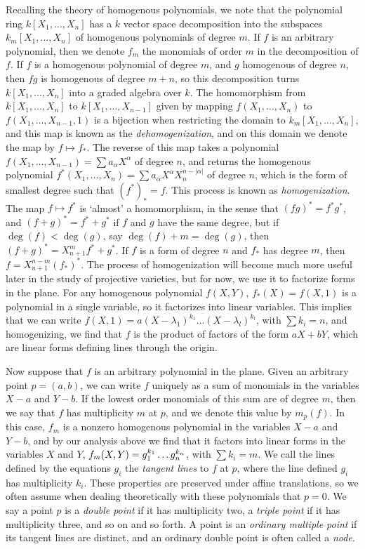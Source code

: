 Recalling the theory of homogenous polynomials, we note that the polynomial ring $k[X_1, \dots, X_n]$ has a $k$ vector space decomposition into the subspaces $k_m[X_1, \dots, X_n]$ of homogenous polynomials of degree $m$. If $f$ is an arbitrary polynomial, then we denote $f_m$ the monomials of order $m$ in the decomposition of $f$. If $f$ is a homogenous polynomial of degree $m$, and $g$ homogenous of degree $n$, then $fg$ is homogenous of degree $m + n$, so this decomposition turns $k[X_1, \dots, X_n]$ into a graded algebra over $k$. The homomorphism from $k[X_1, \dots, X_n]$ to $k[X_1, \dots, X_{n-1}]$ given by mapping $f(X_1, \dots, X_n)$ to $f(X_1,\dots,X_{n-1},1)$ is a bijection when restricting the domain to $k_m[X_1, \dots, X_n]$, and this map is known as the \emph{dehomogenization}, and on this domain we denote the map by $f \mapsto f_*$. The reverse of this map takes a polynomial $f(X_1, \dots, X_{n-1}) = \sum a_\alpha X^\alpha$ of degree $n$, and returns the homogenous polynomial $f^*(X_1, \dots, X_n) = \sum a_\alpha X^\alpha X_n^{n-|\alpha|}$ of degree $n$, which is the form of smallest degree such that $(f^*)_* = f$. This process is known as \emph{homogenization}. The map $f \mapsto f^*$ is `almost' a homomorphism, in the sense that $(fg)^* = f^*g^*$, and $(f + g)^* = f^* + g^*$ if $f$ and $g$ have the same degree, but if $\deg(f) < \deg(g)$, say $\deg(f) + m = \deg(g)$, then $(f + g)^* = X_{n+1}^m f^* + g^*$. If $f$ is a form of degree $n$ and $f_*$ has degree $m$, then $f = X_{n+1}^{n-m} (f_*)^*$. The process of homogenization will become much more useful later in the study of projective varieties, but for now, we use it to factorize forms in the plane. For any homogenous polynomial $f(X,Y)$, $f_*(X) = f(X,1)$ is a polynomial in a single variable, so it factorizes into linear variables. This implies that we can write $f(X,1) = a(X-\lambda_1)^{k_1} \dots (X - \lambda_l)^{k_l}$, with $\sum k_i = n$, and homogenizing, we find that $f$ is the product of factors of the form $aX + bY$, which are linear forms defining lines through the origin.

Now suppose that $f$ is an arbitrary polynomial in the plane. Given an arbitrary point $p = (a,b)$, we can write $f$ uniquely as a sum of monomials in the variables $X-a$ and $Y-b$. If the lowest order monomials of this sum are of degree $m$, then we say that $f$ has multiplicity $m$ at $p$, and we denote this value by $m_p(f)$. In this case, $f_m$ is a nonzero homogenous polynomial in the variables $X-a$ and $Y-b$, and by our analysis above we find that it factors into linear forms in the variables $X$ and $Y$, $f_m(X,Y) = \smash{g_1^{k_1} \dots g_n^{k_n}}$, with $\sum k_i = m$. We call the lines defined by the equations $g_i$ the \emph{tangent lines} to $f$ at $p$, where the line defined $g_i$ has multiplicity $k_i$. These properties are preserved under affine translations, so we often assume when dealing theoretically with these polynomials that $p = 0$. We say a point $p$ is a \emph{double point} if it has multiplicity two, a \emph{triple point} if it has multiplicity three, and so on and so forth. A point is an \emph{ordinary multiple point} if its tangent lines are distinct, and an ordinary double point is often called a \emph{node}.

